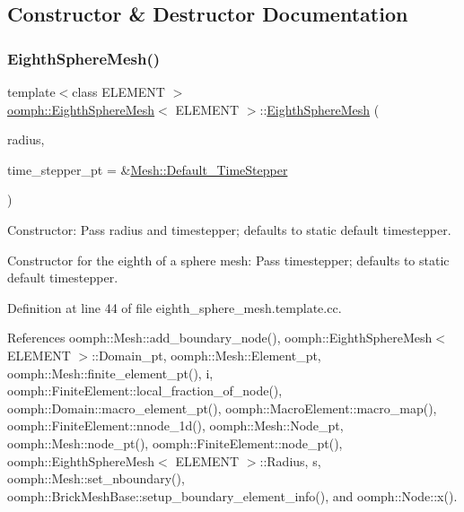 \subsection{Constructor \& Destructor Documentation}
\mbox{\label{classoomph_1_1EighthSphereMesh_a0457fc188d930a1e8853a3f0e1effbb3}} 
\subsubsection{\texorpdfstring{Eighth\+Sphere\+Mesh()}{EighthSphereMesh()}}
{\footnotesize\ttfamily template$<$class E\+L\+E\+M\+E\+NT $>$ \\
\hyperlink{classoomph_1_1EighthSphereMesh}{oomph\+::\+Eighth\+Sphere\+Mesh}$<$ E\+L\+E\+M\+E\+NT $>$\+::\hyperlink{classoomph_1_1EighthSphereMesh}{Eighth\+Sphere\+Mesh} (\begin{DoxyParamCaption}\item[{const double \&}]{radius,  }\item[{\hyperlink{classoomph_1_1TimeStepper}{Time\+Stepper} $\ast$}]{time\+\_\+stepper\+\_\+pt = {\ttfamily \&\hyperlink{classoomph_1_1Mesh_a12243d0fee2b1fcee729ee5a4777ea10}{Mesh\+::\+Default\+\_\+\+Time\+Stepper}} }\end{DoxyParamCaption})}



Constructor\+: Pass radius and timestepper; defaults to static default timestepper. 

Constructor for the eighth of a sphere mesh\+: Pass timestepper; defaults to static default timestepper. 

Definition at line 44 of file eighth\+\_\+sphere\+\_\+mesh.\+template.\+cc.



References oomph\+::\+Mesh\+::add\+\_\+boundary\+\_\+node(), oomph\+::\+Eighth\+Sphere\+Mesh$<$ E\+L\+E\+M\+E\+N\+T $>$\+::\+Domain\+\_\+pt, oomph\+::\+Mesh\+::\+Element\+\_\+pt, oomph\+::\+Mesh\+::finite\+\_\+element\+\_\+pt(), i, oomph\+::\+Finite\+Element\+::local\+\_\+fraction\+\_\+of\+\_\+node(), oomph\+::\+Domain\+::macro\+\_\+element\+\_\+pt(), oomph\+::\+Macro\+Element\+::macro\+\_\+map(), oomph\+::\+Finite\+Element\+::nnode\+\_\+1d(), oomph\+::\+Mesh\+::\+Node\+\_\+pt, oomph\+::\+Mesh\+::node\+\_\+pt(), oomph\+::\+Finite\+Element\+::node\+\_\+pt(), oomph\+::\+Eighth\+Sphere\+Mesh$<$ E\+L\+E\+M\+E\+N\+T $>$\+::\+Radius, s, oomph\+::\+Mesh\+::set\+\_\+nboundary(), oomph\+::\+Brick\+Mesh\+Base\+::setup\+\_\+boundary\+\_\+element\+\_\+info(), and oomph\+::\+Node\+::x().

